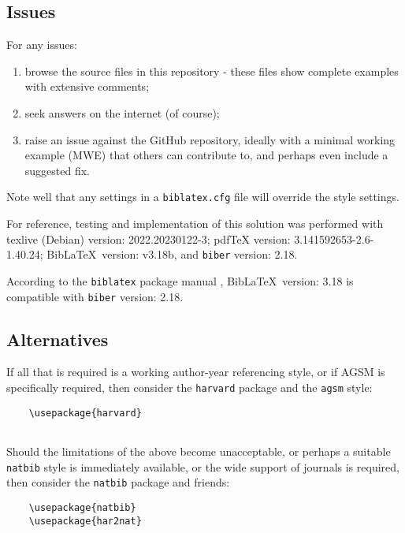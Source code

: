 \documentclass[a4paper, 11pt]{article}
\newcommand*{\BibLaTeX}{Bib\LaTeX}
\begin{document}
\subsection{Issues}

For any issues:

\begin{enumerate}
\item browse the source files in this repository - these files show complete examples with extensive comments;
\item seek answers on the internet (of course);
\item raise an issue against the GitHub repository, ideally with a minimal working example (MWE)
that others can contribute to, and perhaps even include a suggested fix.
\end{enumerate}

Note well that any settings in a \texttt{biblatex.cfg} file will override the style settings.

\medskip
\noindent
For reference, testing and implementation of this solution was performed with texlive (Debian)
version: 2022.20230122-3; pdfTeX version: 3.141592653-2.6-1.40.24; \BibLaTeX\ version: v3.18b, and
\texttt{biber} version: 2.18.

According to the \texttt{biblatex} package manual \autocite[8]{KimeEtAl2022biblatPackag},
\BibLaTeX\ version: 3.18 is compatible with \texttt{biber} version: 2.18.

\subsection{Alternatives}
\label{subsec:Alternatives}

If all that is required is a working author-year referencing style, or if AGSM is specifically
required, then consider the \texttt{harvard} package and the \texttt{agsm} style:

\begin{verbatim}
    \usepackage{harvard}
    
\end{verbatim}

Should the limitations of the above become unacceptable, or perhaps a suitable \texttt{natbib} style
is immediately available, or the wide support of journals is required, then consider the
\texttt{natbib} package and friends:

\begin{verbatim}
    \usepackage{natbib}
    \usepackage{har2nat}
    
\end{verbatim}
\end{document}

